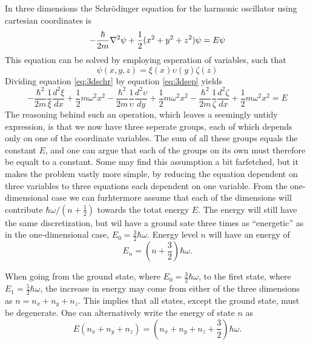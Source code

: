 \documentclass{article}
\begin{document}
In three dimensions the Schrödinger equation for the harmonic oscillator using cartesian coordinates is
\begin{equation}
\label{eq:3dschr}
-\frac{\hbar}{2m}\laplacian \psi + \frac{1}{2}(x^2+y^2+z^2)\psi = E\psi
\end{equation}
This equation can be solved by employing esperation of variables, such that
\begin{equation}
\label{eq:3dsep}
\psi(x,y,z)=\xi(x)\upsilon(y)\zeta(z)
\end{equation}
Dividing equation \ref{eq:3dschr} by equation \ref{eq:3dsep} yields
\begin{equation}
-\frac{\hbar^2}{2m}\frac{1}{\xi}\frac{d^2\xi}{dx} + \frac{1}{2}m\omega^2x^2
-\frac{\hbar^2}{2m}\frac{1}{\upsilon}\frac{d^2\upsilon}{dy} + \frac{1}{2}m\omega^2x^2
-\frac{\hbar^2}{2m}\frac{1}{\zeta}\frac{d^2\zeta}{dx} + \frac{1}{2}m\omega^2x^2
=E
\end{equation}
The reasoning behind such an operation, which leaves a seemingly untidy expression, is that we now have three seperate groups, each of which depends only on one of the coordinate variables. The sum of all these groups equals the constant $E$, and one can argue that each of the groups on its own must therefore be equalt to a constant. Some may find this assumption a bit farfetched, but it makes the problem vastly more simple, by reducing the equation dependent on three variables to three equations each dependent on one variable. From the one-dimensional case we can furhtermore assume that each of the dimensions will contribute $\hbar\omega/(n+\frac{1}{2})$ towards the totat energy $E$. The energy will still have the same discretization, but wil have a ground sate three times as ``energetic'' as in the one-dimensional case, $E_0=\frac{3}{2}\hbar\omega$. Energy level $n$ will have an energy of
\begin{equation}
E_n=\left(n+\frac{3}{2}\right)\hbar\omega.
\end{equation}

When going from the ground state, where $E_0=\frac{3}{2}\hbar\omega$, to the first state, where $E_1=\frac{5}{2}\hbar\omega$, the increase in energy may come from either of the three dimensions as $n=n_x+n_y+n_z$. This implies that all states, except the ground state, must be degenerate. One can alternatively write the energy of state $n$ as
\begin{equation}
E(n_x+n_y+n_z)=(n_x+n_y+n_z+\frac{3}{2})\hbar\omega.
\end{equation}
\end{document}
